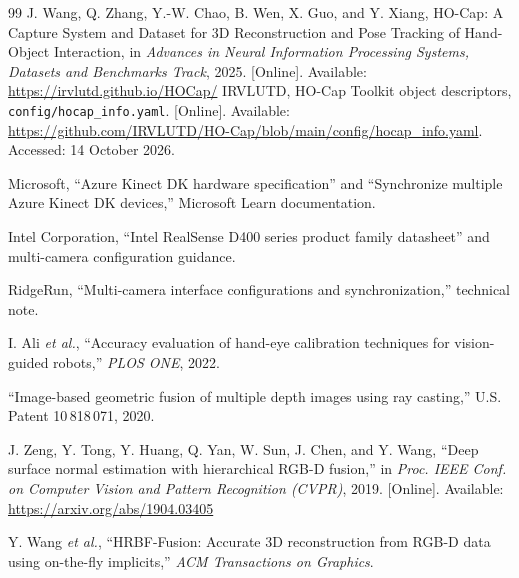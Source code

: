 \begin{thebibliography}{99}
J. Wang, Q. Zhang, Y.-W. Chao, B. Wen, X. Guo, and Y. Xiang,
HO-Cap: A Capture System and Dataset for 3D Reconstruction and Pose
Tracking of Hand-Object Interaction, in \emph{Advances in Neural Information
Processing Systems, Datasets and Benchmarks Track}, 2025.
[Online]. Available: \url{https://irvlutd.github.io/HOCap/}
IRVLUTD, {HO-Cap Toolkit object descriptors},
\texttt{config/hocap\_info.yaml}.
[Online]. Available:
\url{https://github.com/IRVLUTD/HO-Cap/blob/main/config/hocap_info.yaml}.
Accessed: 14 October 2026.

Microsoft, ``Azure Kinect DK hardware specification'' and ``Synchronize
multiple Azure Kinect DK devices,'' Microsoft Learn documentation.

Intel Corporation, ``Intel RealSense D400 series product family datasheet'' and
multi-camera configuration guidance. 

RidgeRun, ``Multi-camera interface configurations and synchronization,''
technical note. 

I. Ali \emph{et al.}, ``Accuracy evaluation of hand-eye calibration techniques
for vision-guided robots,'' \emph{PLOS ONE}, 2022. 

``Image-based geometric fusion of multiple depth images using ray casting,''
U.S. Patent 10\,818\,071, 2020.

J. Zeng, Y. Tong, Y. Huang, Q. Yan, W. Sun, J. Chen, and Y. Wang, ``Deep
surface normal estimation with hierarchical RGB-D fusion,'' in \emph{Proc. IEEE
Conf. on Computer Vision and Pattern Recognition (CVPR)}, 2019. [Online].
Available: \url{https://arxiv.org/abs/1904.03405}

Y. Wang \emph{et al.}, ``HRBF-Fusion: Accurate 3D reconstruction from RGB-D
data using on-the-fly implicits,'' \emph{ACM Transactions on Graphics}.

\end{thebibliography}

\vspace{4mm}
\noindent{}
